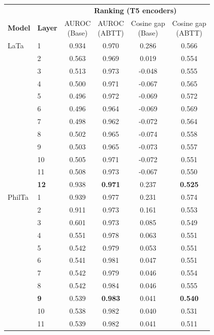 \begin{table}[t]
\centering
\scriptsize
\setlength{\tabcolsep}{3pt}
\begin{tabular}{llcccc}
\toprule
\multicolumn{2}{c}{} & \multicolumn{4}{c}{\textbf{Ranking (T5 encoders)}} \\
\cmidrule(lr){3-6}
\textbf{Model} & \textbf{Layer} & \makecell{AUROC\\(Base)} & \makecell{AUROC\\(ABTT)} & \makecell{Cosine gap\\(Base)} & \makecell{Cosine gap\\(ABTT)} \\
\midrule
LaTa & 1 & 0.934 & 0.970 & 0.286 & 0.566 \\
 & 2 & 0.563 & 0.969 & 0.019 & 0.554 \\
 & 3 & 0.513 & 0.973 & -0.048 & 0.555 \\
 & 4 & 0.500 & 0.971 & -0.067 & 0.565 \\
 & 5 & 0.496 & 0.972 & -0.069 & 0.572 \\
 & 6 & 0.496 & 0.964 & -0.069 & 0.569 \\
 & 7 & 0.498 & 0.962 & -0.072 & 0.564 \\
 & 8 & 0.502 & 0.965 & -0.074 & 0.558 \\
 & 9 & 0.503 & 0.965 & -0.073 & 0.557 \\
 & 10 & 0.505 & 0.971 & -0.072 & 0.551 \\
 & 11 & 0.508 & 0.973 & -0.067 & 0.550 \\
 & \textbf{12} & 0.938 & \textbf{0.971} & 0.237 & \textbf{0.525} \\
\midrule
PhilTa & 1 & 0.939 & 0.977 & 0.231 & 0.574 \\
 & 2 & 0.911 & 0.973 & 0.161 & 0.553 \\
 & 3 & 0.601 & 0.973 & 0.085 & 0.549 \\
 & 4 & 0.551 & 0.978 & 0.063 & 0.551 \\
 & 5 & 0.542 & 0.979 & 0.053 & 0.551 \\
 & 6 & 0.541 & 0.981 & 0.047 & 0.551 \\
 & 7 & 0.542 & 0.979 & 0.046 & 0.554 \\
 & 8 & 0.542 & 0.984 & 0.046 & 0.555 \\
 & \textbf{9} & 0.539 & \textbf{0.983} & 0.041 & \textbf{0.540} \\
 & 10 & 0.538 & 0.982 & 0.040 & 0.531 \\
 & 11 & 0.539 & 0.982 & 0.041 & 0.511 \\

\end{tabular}
\end{table}

